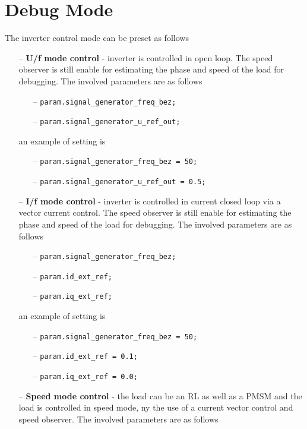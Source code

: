 \documentclass[11pt,a4paper,oneside]{book}
\numberwithin{equation}{section}
\theoremstyle{it}
\theoremstyle{definition}
\begin{document}
\section{Debug Mode}	
The inverter control mode can be preset as follows
\begin{itemize}
	\item[--] \textbf{U/f mode control} - inverter is controlled in open loop. The speed observer is still enable for estimating the phase and speed of the load for debugging. The involved parameters are as follows
	\begin{itemize}
		\item[--] \texttt{param.signal\_generator\_freq\_bez;}
		\item[--] \texttt{param.signal\_generator\_u\_ref\_out;}
	\end{itemize} 
	an example of setting is 
	\begin{itemize}
		\item[--] \texttt{param.signal\_generator\_freq\_bez = 50;}
		\item[--] \texttt{param.signal\_generator\_u\_ref\_out = 0.5;}
	\end{itemize} 
	\item[--] \textbf{ I/f mode control} - inverter is controlled in current closed loop via a vector current control. The speed observer is still enable for estimating the phase and speed of the load for debugging. The involved parameters are as follows
	\begin{itemize}
		\item[--] \texttt{param.signal\_generator\_freq\_bez;}   
		\item[--] \texttt{param.id\_ext\_ref;}   	
		\item[--] \texttt{param.iq\_ext\_ref;}   
	\end{itemize} 
	an example of setting is
	\begin{itemize}
		\item[--] \texttt{param.signal\_generator\_freq\_bez = 50;}   
		\item[--] \texttt{param.id\_ext\_ref = 0.1;}   	
		\item[--] \texttt{param.iq\_ext\_ref = 0.0;}   
	\end{itemize} 
	\item[--] \textbf{Speed mode control} - the load can be an RL as well as a PMSM and the load is controlled in speed mode, ny the use of a current vector control and speed observer. The involved parameters are as follows
	\begin{itemize}

\end{itemize}
\end{itemize}
\end{document}
